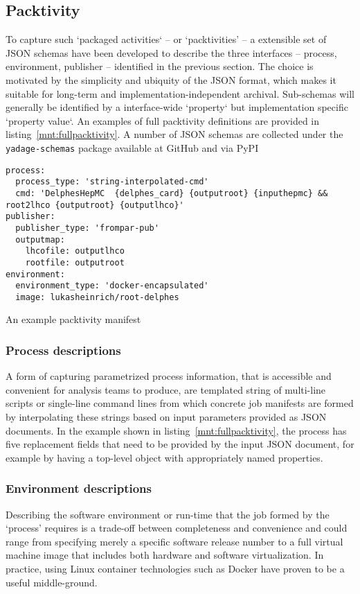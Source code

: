 \documentclass[a4paper]{jpconf}
\begin{document}
\subsection{Packtivity}

To capture such `packaged activities` -- or `packtivities' -- a extensible set of JSON schemas have been developed to describe the three interfaces -- process, environment, publisher -- identified in the previous section. The choice is motivated by the simplicity and ubiquity of the JSON format, which makes it suitable for long-term and implementation-independent archival. Sub-schemas will generally be identified by a interface-wide `property` but implementation specific `property value`. An examples of full packtivity definitions are provided in listing~\ref{mnt:fullpacktivity}. A number of JSON schemas are collected under the \verb+yadage-schemas+ package available at GitHub and via PyPI\cite{yadage-schemas}

\begin{listing}[!ht]
\begin{verbatim}
process:
  process_type: 'string-interpolated-cmd'
  cmd: 'DelphesHepMC  {delphes_card} {outputroot} {inputhepmc} && root2lhco {outputroot} {outputlhco}'
publisher:
  publisher_type: 'frompar-pub'
  outputmap:
    lhcofile: outputlhco
    rootfile: outputroot
environment:
  environment_type: 'docker-encapsulated'
  image: lukasheinrich/root-delphes
\end{verbatim}
\caption{An example packtivity manifest}
\label{mnt:fullpacktivity}
\end{listing}

\subsubsection{Process descriptions}
A form of capturing parametrized process information, that is accessible and convenient for analysis teams to produce, are templated string of multi-line scripts or single-line command lines from which concrete job manifests are formed by interpolating these strings based on input parameters provided as JSON documents. In the example shown in listing~\ref{mnt:fullpacktivity}, the process has five replacement fields that need to be provided by the input JSON document, for example by having a top-level object with appropriately named properties.

\subsubsection{Environment descriptions}
Describing the software environment or run-time that the job formed by the `process' requires is a trade-off between completeness and convenience and could range from specifying merely a specific software release number to a full virtual machine image that includes both hardware and software virtualization. In practice, using Linux container technologies such as Docker have proven to be a useful middle-ground.
\end{document}

